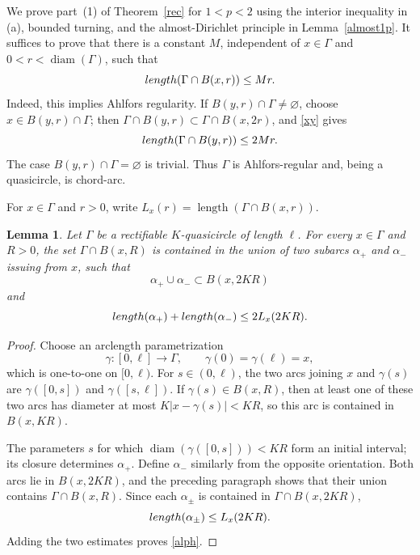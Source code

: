 \documentclass[11pt]{article}
\numberwithin{equation}{section}
\newtheorem{lemma}[theorem]{Lemma}
\theoremstyle{remark}
\newcommand{\diam}{\operatorname{diam}}
\begin{document}
We  prove part~\rm(1) of Theorem~\ref{rec} for $1<p<2$ using the
interior inequality in \rm(a), bounded turning, and the almost-Dirichlet
principle in Lemma~\ref{almost1p}.  It suffices to prove that there is a
constant $M$, independent of $x\in\Gamma$ and $0<r<\diam(\Gamma)$, such
that
\begin{equation}\label{xy}
    {\rm length}(\Gamma\cap B(x, r))\leq Mr.
\end{equation} 
Indeed, this implies Ahlfors regularity.  If
$B(y,r)\cap\Gamma\ne\varnothing$, choose $x\in B(y,r)\cap\Gamma$; then
$\Gamma\cap B(y,r)\subset\Gamma\cap B(x,2r)$, and \eqref{xy} gives
$$
{\rm length}(\Gamma\cap B(y, r))\leq 2Mr.
$$
The case $B(y,r)\cap\Gamma=\varnothing$ is trivial.  Thus $\Gamma$ is
Ahlfors-regular and, being a quasicircle, is chord-arc.

For $x\in\Gamma$ and $r>0$, write
$L_x(r)=\operatorname{length}(\Gamma\cap B(x,r))$.
\begin{lemma}\label{2arc}
Let $\Gamma$ be a rectifiable $K$-quasicircle of length $\ell$.  For
every $x\in\Gamma$ and $R>0$, the set $\Gamma\cap B(x,R)$ is contained in
the union of two 
subarcs $\alpha_+$ and $\alpha_-$ issuing from $x$, such that
\[
  \alpha_+\cup\alpha_-\subset B(x,2KR)
\]
and
\begin{equation}\label{alph}
  {\rm length}(\alpha_+)+{\rm length}(\alpha_-)
  \le2L_x(2KR).
\end{equation}
\end{lemma}

\begin{proof}
Choose an arclength parametrization
\[
  \gamma:[0,\ell]\longrightarrow\Gamma,
  \qquad \gamma(0)=\gamma(\ell)=x,
\]
which is one-to-one on $[0,\ell)$. For $s\in(0,\ell)$, the two arcs joining
$x$ and $\gamma(s)$ are $ \gamma([0,s])$ and $\gamma([s,\ell]).$  
If $\gamma(s)\in B(x,R)$, then at least one of these two
arcs has diameter at most $K|x-\gamma(s)|<KR$, so this arc is contained in
$B(x,KR)$.

The parameters $s$ for which $\diam(\gamma([0,s]))<KR$ form an
initial interval; its closure determines $\alpha_+$.  Define $\alpha_-$
similarly from the opposite orientation.  Both arcs lie in $B(x,2KR)$, and
the preceding paragraph shows that their union contains
$\Gamma\cap B(x,R)$.  Since each $\alpha_\pm$ is contained in
$\Gamma\cap B(x,2KR)$,
\[
  {\rm length}(\alpha_\pm)\le L_x(2KR).
\]
Adding the two estimates proves \eqref{alph}.
\end{proof}
\end{document}
